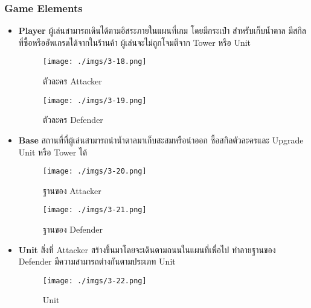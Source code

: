 \documentclass[12pt,oneside,openright,a4paper]{cpe-thai-project}
\begin{document}
\subsubsection{Game Elements}
\begin{itemize}
  
  \item \textbf{Player} ผู้เล่นสามารถเดินได้ตามอิสระภายในแผนที่เกม โดยมีกระเป๋า
  สำหรับเก็บน้ำตาล มีสกิลที่ซื้อหรืออัพเกรดได้จากในร้านค้า
  ผู้เล่นจะไม่ถูกโจมตีจาก Tower หรือ Unit
  
    \begin{figure}[H]\centering
      \begin{minipage}{.3\textwidth}
        \centering
        \texttt{[image: ./imgs/3-18.png]}
        \caption{ตัวละคร Attacker}\label{fig:3-18}
      \end{minipage}
      \begin{minipage}{.3\textwidth}
        \centering
        \texttt{[image: ./imgs/3-19.png]}
        \caption{ตัวละคร Defender}\label{fig:3-19}
      \end{minipage}
    \end{figure}
  
  \item \textbf{Base} สถานที่ที่ผู้เล่นสามารถนำน้ำตาลมาเก็บสะสมหรือนำออก 
  ซื้อสกิลตัวละครและ Upgrade Unit หรือ Tower ได้
  
    \begin{figure}[H]\centering
      \begin{minipage}{.3\textwidth}
        \centering
        \texttt{[image: ./imgs/3-20.png]}
        \caption{ฐานของ Attacker}\label{fig:3-20}
      \end{minipage}
      \begin{minipage}{.3\textwidth}
        \centering
        \texttt{[image: ./imgs/3-21.png]}
        \caption{ฐานของ Defender}\label{fig:3-21}
      \end{minipage}
    \end{figure}
  
  \pagebreak  
  \item \textbf{Unit} สิ่งที่ Attacker สร้างขึ้นมาโดยจะเดินตามถนนในแผนที่เพื่อไป
  ทำลายฐานของ Defender มีความสามารถต่างกันตามประเภท Unit
    
    \begin{figure}[H]\centering
      \texttt{[image: ./imgs/3-22.png]}
      \caption{Unit}\label{fig:3-22}
    \end{figure}
    

\end{itemize}
\end{document}
